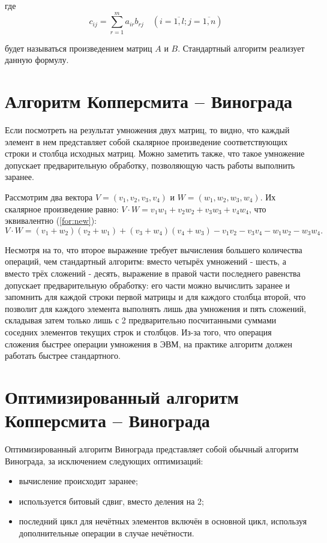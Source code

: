 \documentclass[12pt]{report}
\begin{document}
где
\begin{equation}
	\label{eq:M}
	c_{ij} =
		\sum_{r=1}^{m} a_{ir}b_{rj} \quad (i=\overline{1,l}; j=\overline{1,n})
\end{equation}

будет называться произведением матриц $A$ и $B$.
Стандартный алгоритм реализует данную формулу.

\section{Алгоритм Копперсмита -- Винограда}

Если посмотреть на результат умножения двух матриц, то видно, что каждый элемент в нем представляет собой скалярное произведение соответствующих строки и столбца исходных матриц.
Можно заметить также, что такое умножение допускает предварительную обработку, позволяющую часть работы выполнить заранее.

Рассмотрим два вектора $V = (v_1, v_2, v_3, v_4)$ и $W = (w_1, w_2, w_3, w_4)$.
Их скалярное произведение равно: $V \cdot W = v_1w_1 + v_2w_2 + v_3w_3 + v_4w_4$, что эквивалентно (\ref{for:new}):
\begin{equation}
	\label{for:new}
		V \cdot W = (v_1 + w_2)(v_2 + w_1) + (v_3 + w_4)(v_4 + w_3) - v_1v_2 - v_3v_4 - w_1w_2 - w_3w_4.
\end{equation}

Несмотря на то, что второе выражение требует вычисления большего количества операций, чем стандартный алгоритм: вместо четырёх умножений - шесть, а вместо трёх сложений - десять, выражение в правой части последнего равенства допускает предварительную обработку: его части можно вычислить заранее и запомнить для каждой строки первой матрицы и для каждого столбца второй, что позволит для каждого элемента выполнять лишь два умножения и пять сложений, складывая затем только лишь с 2 предварительно посчитанными суммами соседних элементов текущих строк и столбцов.
Из-за того, что операция сложения быстрее операции умножения в ЭВМ, на практике алгоритм должен работать быстрее стандартного.

\section{Оптимизированный алгоритм Копперсмита – Винограда}
Оптимизированный алгоритм Винограда представляет собой обычный алгоритм Винограда, за исключением следующих оптимизаций:
\begin{itemize}
    \item вычисление происходит заранее;
    \item используется битовый сдвиг, вместо деления на 2;
    \item последний цикл для нечётных элементов включён в основной цикл, используя дополнительные операции в случае нечётности.
\end{itemize}
\end{document}
